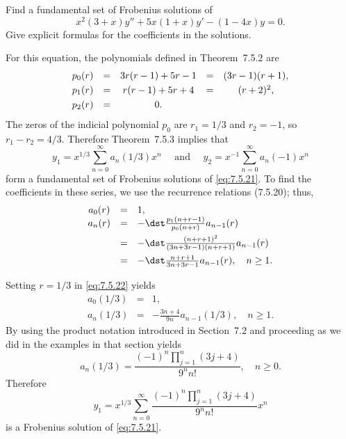 \setcounter{example}{1}
\setcounter{equation}{20}
\begin{example}
  \label{example:7.5.2}\rm Find a fundamental set of Frobenius solutions of
  \begin{equation}
    \label{eq:7.5.21}x^{2}(3+x)y''+5x(1+x)y'-(1-4x)y=0.
  \end{equation}
  Give explicit formulas for the coefficients in the solutions.
\end{example}
\setcounter{equation}{21}
\begin{examplesolution}
\solution For this equation, the polynomials defined in Theorem~7.5.2 are
\[
  \begin{array}{ccccc}
    p_{0}(r) & = & 3r(r-1)+5r-1 & = & (3r-1)(r+1), \\[1\jot]
    p_{1}(r) & = & r(r-1)+5r+4  & = & (r+2)^{2},   \\[1\jot]
    p_{2}(r) & = & 0.
  \end{array}
\]
The zeros of the indicial polynomial $p_{0}$ are $r_{1}=1/3$ and $r_{2}=-1$, so $r_{1}-r_{2}=4/3$.
Therefore Theorem~7.5.3 implies that
\[
  y_{1}=x^{1/3}\sum_{n=0}^{\infty}a_{n}(1/3)x^{n}\quad\mbox{ and }\quad y_{2}=x^{-1}\sum_{n=0}^{\infty}a_{n}(-1)x^{n}
\]
form a fundamental set of Frobenius solutions of \eqref{eq:7.5.21}. To find the coefficients in
these series, we use the recurrence relations \textup{(7.5.20)}; thus,
\begin{equation}
  \label{eq:7.5.22}
  \begin{array}{ccl}
    a_{0}(r) & = & 1,                                                  \\
    a_{n}(r) & = & -\dst\frac{p_{1}(n+r-1)}{p_{0}(n+r)}a_{n-1}(r)      \\[2\jot]
             & = & -\dst\frac{(n+r+1)^{2}}{(3n+3r-1)(n+r+1)}a_{n-1}(r) \\[2\jot]
             & = & -\dst\frac{n+r+1}{3n+3r-1}a_{n-1}(r),\quad n\ge1.
  \end{array}
\end{equation}

Setting $r=1/3$ in \eqref{eq:7.5.22} yields
\begin{eqnarray*}
  a_{0}(1/3) & = & 1, \\
  a_{n}(1/3) & = & -\frac{3n+4}{9n}a_{n-1}(1/3),\quad n\ge1.
\end{eqnarray*}
By using the product notation introduced in Section~7.2 and proceeding as we did in the examples in
that section yields
\[
  a_{n}(1/3)=\frac{(-1)^{n}\prod_{j=1}^{n}(3j+4)}{9^{n}n!},\quad n\ge0.
\]
Therefore
\[
  y_{1}=x^{1/3}\sum_{n=0}^{\infty}\frac{(-1)^{n}\prod_{j=1}^{n}(3j+4)}{9^{n}n!}x^{n}
\]
is a Frobenius solution of \eqref{eq:7.5.21}.


\end{examplesolution}
